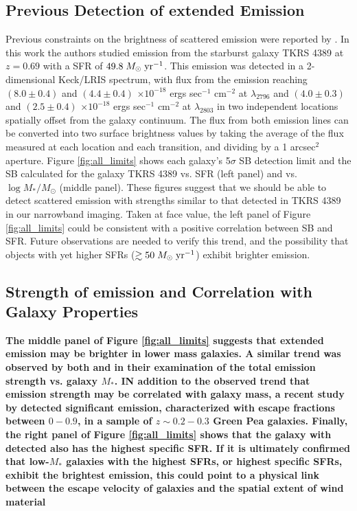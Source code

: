\documentclass[twocolumn]{aastex62}
\def \msunperyr {{\; M_{\odot}\rm \;yr^{-1}}}
\begin{document}
\subsection{Previous Detection of extended  Emission}
Previous constraints on the brightness of scattered  emission were reported by \cite{Rubin_2011}. In this work the authors studied emission from the starburst galaxy TKRS 4389 at $z = 0.69$ with a SFR of $49.8\msunperyr$. This emission was detected in a 2-dimensional Keck/LRIS spectrum, with flux from the emission reaching $(8.0 \pm 0.4)$ and $(4.4 \pm 0.4)$ $\times10^{-18}$ ergs sec$^{-1}$ cm$^{-2}$ at  $\lambda _{2796}$ and $(4.0 \pm 0.3)$ and $(2.5 \pm 0.4)$ $\times10^{-18}$ ergs sec$^{-1}$ cm$^{-2}$ at $\lambda_{2803}$ in two independent locations spatially offset from the galaxy continuum. The flux from both emission lines can be converted into two surface brightness values by taking the average of the flux measured at each location and each transition, and dividing by a 1 arcsec$^2$ aperture. Figure \ref{fig:all_limits} shows each galaxy's 5$\sigma$ SB detection limit and the SB calculated for the galaxy TKRS 4389 vs. SFR (left panel) and vs.\ $\log M_*/M_{\odot}$ (middle panel). These figures suggest that we should be able to detect scattered  emission with strengths similar to that detected in TKRS 4389 in our narrowband imaging. Taken at face value, the left panel of Figure \ref{fig:all_limits} could be consistent with a positive correlation between  SB and SFR. Future observations are needed to verify this trend, and the possibility that objects with yet higher SFRs ($\gtrsim50 \msunperyr$) exhibit brighter  emission. 


\subsection{Strength of  emission and Correlation with Galaxy Properties }
\textbf{The middle panel of Figure \ref{fig:all_limits} suggests that extended  emission may be brighter in lower mass galaxies. A similar trend was observed by both \cite{Erb2012} and \cite{Feltre2018} in their examination of the total  emission strength vs. galaxy $M_*$. IN addition to the observed trend that emission strength may be correlated with galaxy mass, a recent study by \cite{Henry2018} detected significant  emission, characterized with escape fractions between $0-0.9$, in a sample of $z \sim 0.2-0.3$ Green Pea galaxies.   Finally, the right panel of Figure \ref{fig:all_limits} shows that the galaxy with detected  also has the highest specific SFR. If it is ultimately confirmed that low-$M_*$ galaxies with the highest SFRs, or highest specific SFRs, exhibit the brightest emission, this could point to a physical link between the escape velocity of galaxies and the spatial extent of wind material}
\end{document}
